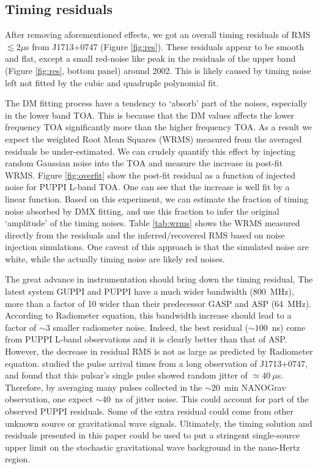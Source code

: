\subsection{Timing residuals}
\label{sec:res}

After removing aforementioned effects, we got an overall timing residuals of RMS $\lesssim 2\mu$s from J1713+0747 (Figure \ref{fig:res}).
These residuals appear to be smooth and flat, except a small red-noise like
peak in the residuals of the upper band (Figure
\ref{fig:res}, bottom panel) around 2002. This is likely caused by timing noise left
not fitted by the cubic and quadruple polynomial fit.

The DM fitting process have a tendency to
`absorb' part of the noises, especially in the lower band TOA. This is because
that the DM values affects the lower frequency TOA significantly more than the
higher frequency TOA. 
As a result we expect the weighted Root Mean Squares (WRMS) measured from the
averaged residuals be under-estimated. We can crudely quantify
this effect by injecting random Gaussian noise into the TOA and
measure the increase in post-fit WRMS. Figure \ref{fig:overfit} show
the post-fit residual as a function of injected noise for PUPPI L-band TOA. 
One can see that the increase is well fit by a linear function. 
Based on this experiment, we
can estimate the fraction of timing noise absorbed by DMX fitting, and use
this fraction to infer the original `amplitude' of the timing noises. 
Table \ref{tab:wrms} shows the WRMS measured directly from the residuals and 
the inferred/recovered RMS based on noise injection simulations. One caveat of this
approach is that the simulated noise are white, while the actually timing
noise are likely red noises. 


The great advance in instrumentation should bring down the timing residual,
The latest system GUPPI and PUPPI have a much wider bandwidth (800~MHz), more than
a factor of 10 wider than their predecessor GASP and ASP (64~MHz). According to Radiometer 
equation, this bandwidth increase should lead to a factor of $\sim3$
smaller radiometer noise. 
Indeed, the best residual ($\sim100$~ns) come from PUPPI L-band observations and it is clearly better than that of ASP. However, the decrease in residual RMS is not as large as predicted by Radiometer equation.
\citet{sc12} studied the pulse arrival times from a long observation of
J1713+0747, and found that this pulsar's single pulse showed random jitter of
$\simeq40~\mu$s. Therefore, by averaging many pulses collected in the
$\sim20$~min NANOGrav observation, one expect $\sim 40$~ns of jitter noise. 
This could account for part of the observed PUPPI residuals.
Some of the extra residual could come from other unknown source or gravitational wave signals.
Ultimately, the timing solution and residuals presented in this paper could be used to put a stringent single-source upper limit on the stochastic gravitational wave background in the nano-Hertz region.


